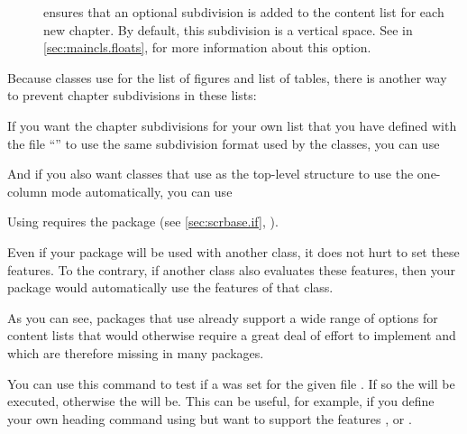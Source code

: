 \begin{description}
\item[] ensures that an optional subdivision is added
  to the content list for each new chapter. By default, this subdivision is a
  vertical space. See %
   in
  \autoref{sec:maincls.floats},  for more
  information about this option.
\end{description}
\begin{Example}
  Because \KOMAScript{} classes use  for the list of figures
  and list of tables, there is another way to prevent chapter subdivisions in
  these lists:
\begin{lstcode}
\end{lstcode}

  If you want the chapter subdivisions for your own list that you have defined
  with the file  ``'' to use the same subdivision
  format used by the \KOMAScript{} classes, you can use
\begin{lstcode}
\end{lstcode}
  And if you also want classes that use  as the
  top-level structure to use the one-column mode automatically, you can
  use
\begin{lstcode}
\end{lstcode}
  Using  requires the
   package (see \autoref{sec:scrbase.if},
  ).

  Even if your package will be used with another class, it
  does not hurt to set these features. To the contrary, if another class also
  evaluates these features, then your package would automatically use the
  features of that class.
\end{Example}
As you can see, packages that use  already support a wide
range of options for content lists that would otherwise require a great deal
of effort to implement and which are therefore missing in many packages.%
\EndIndexGroup


\begin{Declaration}
\end{Declaration}
You can use this command to test if a
 was set for the given file . If so the
 will be executed, otherwise the  will
be. This can be useful, for example, if you define your own heading command
using  but want to support the features
,  or .%
\EndIndexGroup



